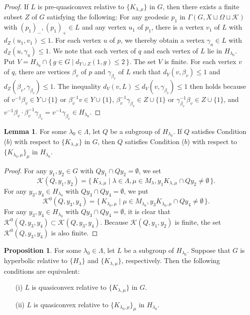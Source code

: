 \documentclass{amsart}
\theoremstyle{definition}
\newtheorem{Lem}[Thm]{Lemma}
\newtheorem{Prop}[Thm]{Proposition}
\begin{document}
\begin{proof}
If $L$ is pre-quasiconvex relative to $\{K_{\lambda,\mu}\}$ in $G$, then there exists a finite subset $Z$ of $G$ satisfying the following: 
For any geodesic $p_1$ in $\Gamma(G,X\sqcup\Omega\sqcup{\mathcal K})$ with $(p_1)_-,(p_1)_+\in L$ and any vertex $u_1$ of $p_1$, there is a vertex $v_1$ of $L$ with $d_Z(u_1,v_1)\leq 1$. 
For each vertex $u$ of $p$, we thereby obtain a vertex $\gamma_u\in L$ with $d_Z(u,\gamma_u)\leq 1$. 
We note that each vertex of $q$ and each vertex of $L$ lie in $H_{\lambda_0}$. 
Put $V=H_{\lambda_0}\cap\{\, g\in G \mid d_{Y\cup Z}(1,g)\leq 2\,\}$. 
The set $V$ is finite. 
For each vertex $v$ of $q$, there are vertices $\beta_v$ of $p$ and $\gamma_{\beta_v}$ of $L$ such that $d_Y(v,\beta_v)\leq 1$ and $d_Z(\beta_v,\gamma_{\beta_v})\leq 1$. 
The inequality $d_V(v,L)\leq d_V(v,\gamma_{\beta_v})\leq 1$ then holds because of $v^{-1}\beta_v\in Y \cup \{1\}$ or $\beta_v^{-1}v\in Y \cup \{1\}$, $\beta_v^{-1}\gamma_{\beta_v}\in Z \cup \{1\}$ or $\gamma_{\beta_v}^{-1}\beta_v\in Z \cup \{1\}$, and $v^{-1}\beta_v\cdot \beta_v^{-1}\gamma_{\beta_v}=v^{-1}\gamma_{\beta_v} \in H_{\lambda_0}$. 
\end{proof}

\begin{Lem}\label{subgr**}
For some $\lambda_0\in\Lambda$, let $Q$ be a subgroup of $H_{\lambda_0}$. 
If $Q$ satisfies Condition ($b$) with respect to $\{K_{\lambda,\mu}\}$ in $G$, then $Q$ satisfies Condition ($b$) with respect to $\{K_{\lambda_0,\mu}\}_\mu$ in $H_{\lambda_0}$. 
\end{Lem}

\begin{proof}
For any $y_1,y_2\in G$ with $Qy_1\cap Qy_2=\emptyset$, we set 
$$
{\mathscr{K}}(Q,y_1,y_2)=\{\, K_{\lambda,\mu} \mid \lambda \in \Lambda, \mu\in M_{\lambda}, y_1K_{\lambda,\mu}\cap Qy_2\ne \emptyset\,\}.
$$ 
For any $y_3,y_4\in H_{\lambda_0}$ with $Qy_3\cap Qy_4=\emptyset$, we put 
$$
{\mathscr{K}}^0(Q,y_3,y_4)=\{\, K_{\lambda_0,\mu} \mid \mu\in M_{\lambda_0}, y_3K_{\lambda_0,\mu}\cap Qy_4\ne \emptyset\,\}.
$$ 
For any $y_3,y_4\in H_{\lambda_0}$ with $Qy_3\cap Qy_4=\emptyset$, it is clear that ${\mathscr{K}}^0(Q,y_3,y_4)\subset {\mathscr{K}}(Q,y_3,y_4)$. 
Because ${\mathscr{K}}(Q,y_1,y_2)$ is finite, the set ${\mathscr{K}}^0(Q,y_3,y_4)$ is also finite. 
\end{proof}

\begin{Prop}\label{nest}
For some $\lambda_0 \in\Lambda$, let $L$ be a subgroup of $H_{\lambda_0}$. 
Suppose that $G$ is hyperbolic relative to $\{H_\lambda\}$ and $\{K_{\lambda,\mu}\}$, respectively. 
Then the following conditions are equivalent:
\begin{enumerate}
\item[(i)]$L$ is quasiconvex relative to $\{K_{\lambda,\mu}\}$ in $G$. 
\item[(ii)]$L$ is quasiconvex relative to $\{K_{\lambda_0,\mu}\}_\mu$ in $H_{\lambda_0}$. 
\end{enumerate}
\end{Prop}
\end{document}
